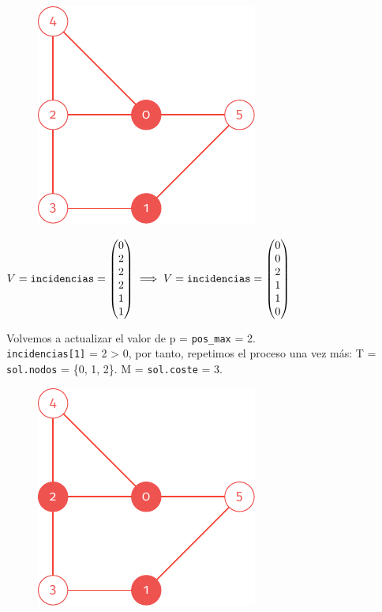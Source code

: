 \documentclass[11pt]{article}
\begin{document}
\begin{figure}[H]
	\centering \includegraphics{./img/grafo-ejemplo-2.pdf}
\end{figure}

\vspace{1em}

$\displaystyle V = \verb|incidencias| =
\begin{pmatrix}
	0 \\
	2 \\
	2 \\
	2 \\
	1 \\
	1
\end{pmatrix} \implies V = \verb|incidencias| =
\begin{pmatrix}
	0 \\
	0 \\
	2 \\
	1 \\
	1 \\
	0
\end{pmatrix}$

\vspace{1em}

Volvemos a actualizar el valor de p = \verb|pos_max| = 2.\\
\verb|incidencias[1]| = 2 > 0, por tanto, repetimos el proceso una vez más: T  = \verb|sol.nodos| = \{0, 1, 2\}.
M = \verb|sol.coste| = 3.

\begin{figure}[H]
	\centering \includegraphics{./img/grafo-ejemplo.pdf}
\end{figure}
\end{document}
